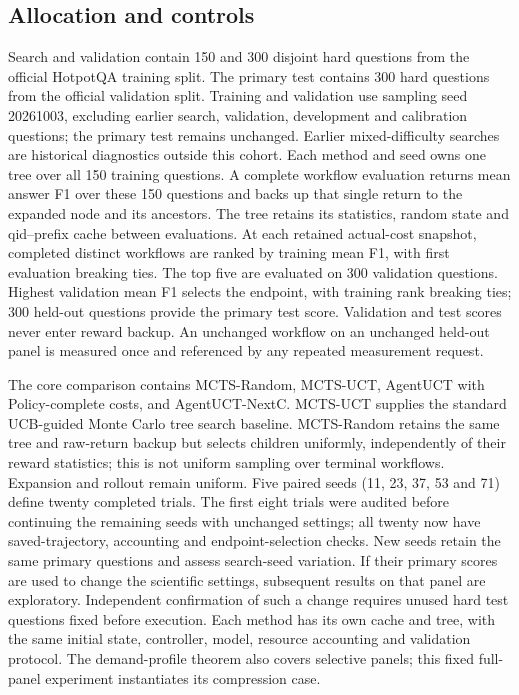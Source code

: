\subsection{Allocation and controls}
Search and validation contain 150 and 300 disjoint hard questions from the
official HotpotQA training split. The primary test contains 300 hard questions
from the official validation split. Training and validation use sampling seed
20261003, excluding earlier search, validation, development and calibration
questions; the primary test remains unchanged. Earlier mixed-difficulty
searches are historical diagnostics outside this cohort.
Each method and seed owns one tree over all 150 training questions. A complete
workflow evaluation returns mean answer F1 over these 150 questions and backs
up that single return to the expanded node and its ancestors. The tree retains
its statistics, random state and qid--prefix cache between evaluations.
At each retained actual-cost snapshot, completed distinct workflows are ranked
by training mean F1, with first evaluation breaking ties. The top five are
evaluated on 300 validation questions. Highest validation mean F1 selects the
endpoint, with training rank breaking ties; 300 held-out questions provide the
primary test score. Validation and test scores never enter reward backup.
An unchanged workflow on an unchanged held-out panel is measured once and
referenced by any repeated measurement request.

The core comparison contains MCTS-Random, MCTS-UCT, AgentUCT with
Policy-complete costs, and AgentUCT-NextC. MCTS-UCT supplies the
standard UCB-guided Monte Carlo tree search baseline. MCTS-Random retains the same
tree and raw-return backup but selects children uniformly, independently of
their reward statistics; this is not uniform sampling over terminal workflows. Expansion and
rollout remain uniform. Five paired seeds (11, 23, 37, 53 and 71) define twenty
completed trials. The first eight trials were audited before continuing the
remaining seeds with unchanged settings; all twenty now have saved-trajectory,
accounting and endpoint-selection checks.
New seeds retain the same primary questions and assess search-seed variation.
If their primary scores are used to change the scientific settings, subsequent
results on that panel are exploratory. Independent confirmation of such a
change requires unused hard test questions fixed before execution.
Each method has its own cache and tree, with the same initial state,
controller, model, resource accounting and validation protocol. The
demand-profile theorem also covers selective panels; this fixed full-panel
experiment instantiates its compression case.


